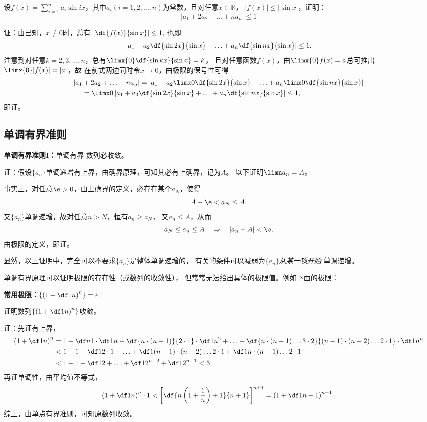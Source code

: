 \bs
\egz 设$f(x)=\sum\limits_{i=1}^na_i\sin
ix$，其中$a_i(i=1,2,\ldots,n)$为常数，且对任意$x\in\mathbb{R}$， $|f(x)|\leq |\sin x|$，证明：
$$\left|a_1+2a_2+\ldots+na_n\right|\leq 1$$

证：由已知，$x\ne 0$时，总有
$\left|\df{f(x)}{\sin x}\right|\leq 1,$
也即
$$\left|a_1+a_2\df{\sin 2x}{\sin x}+\ldots
+a_n\df{\sin nx}{\sin x}\right|\leq 1.$$
注意到对任意$k=2,3,\ldots,n$，总有$\limx{0}\df{\sin kx}{\sin x}=k$，
且对任意函数$f(x)$，由$\limx{0}f(x)=a$总可推出$\limx{0}|f(x)|=|a|$，故
在前式两边同时令$x\to0$，由极限的保号性可得
\begin{align*}
	|a_1&+2a_2+\ldots+na_n|
	=\left|a_1+a_2\limx0\df{\sin 2x}{\sin x}+\ldots
	+a_n\limx0\df{\sin nx}{\sin x}\right|\\
	&=\limx0\left|a_1+a_2\df{\sin 2x}{\sin x}+\ldots
	+a_n\df{\sin nx}{\sin x}\right|\leq 1,
\end{align*}
即证。\fin

\subsection{单调有界准则}

\begin{thx}
	{\bf 单调有界准则I：}单调有界
	数列必收敛。
\end{thx}

证：假设$\{a_n\}$单调递增有上界，由确界原理，可知其必有上确界，记为$A$。
以下证明$\limn a_n=A$。

事实上，对任意$\e>0$，由上确界的定义，必存在某个$a_N$，使得
$$A-\e<a_N\leq A.$$
又$\{a_n\}$单调递增，故对任意$n>N$，恒有$a_n\geq a_N$，
又$a_n\leq A$，从而
$$a_N\leq a_n\leq A\quad\Rightarrow\quad |a_n-A|<\e,$$
由极限的定义，即证。\fin

显然，以上证明中，完全可以不要求$\{a_n\}$是整体单调递增的，
有关的条件可以减弱为$\{a_n\}${\it 从某一项开始}
单调递增。

单调有界原理可以证明极限的存在性（或数列的收敛性），
但常常无法给出具体的极限值。例如下面的极限：

\begin{thx}
	{\bf 常用极限：}$\left\{\left(1+\df1n\right)^n\right\}=e$.
\end{thx}

\egz 证明数列$\left\{\left(1+\df1n\right)^n\right\}$收敛。

证：先证有上界，
\begin{align}
	\left(1+\df1n\right)^n&=1+\df n1\cdot\df1n
	+\df{n\cdot(n-1)}{2\cdot1}\cdot\df1{n^2}+\ldots
	+\df{n\cdot(n-1)\ldots3\cdot2}{(n-1)\cdot(n-2)\ldots2\cdot1}\cdot\df1{n^n}\notag\\
	&<1+1+\df1{2\cdot1}+\ldots+\df1{(n-1)\cdot(n-2)\ldots2\cdot1}
	+\df1{n\cdot(n-1)\ldots2\cdot1}\notag\\
	&<1+1+\df12+\ldots+\df1{2^{n-2}}+\df1{2^{n-1}}<3\notag
\end{align}
再证单调性，由平均值不等式，
$$\left(1+\df1n\right)^n\cdot 1<
\left[\df{n\left(1+\frac1n\right)+1}{n+1}\right]^{n+1}
=\left(1+\df1{n+1}\right)^{n+1}.$$
综上，由单点有界准则，可知原数列收敛。
\fin


